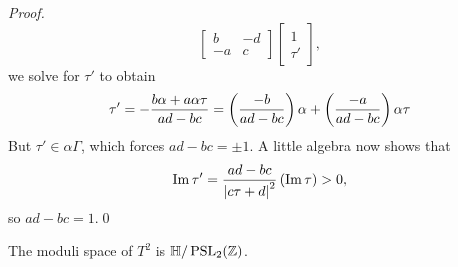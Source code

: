 \documentclass[../Moduli_Spaces_of_Riemann_Surfaces.tex]{subfiles}
\begin{document}
\begin{proof}
\begin{equation*}
\begin{bmatrix}
                b & -d \\
                -a & c
            \end{bmatrix}
            \begin{bmatrix}
                1 \\ \tau'
            \end{bmatrix},
        \end{equation*}
        we solve for $\tau'$ to obtain
        \begin{equation*}
            \tau'=-\frac{b\alpha+a\alpha\tau}{ad-bc}=\left(\frac{-b}{ad-bc}\right)\alpha+\left(\frac{-a}{ad-bc}\right)\alpha\tau
        \end{equation*}
        But $\tau'\in\alpha\Gamma$, which forces $ad-bc=\pm1$. A little algebra now shows that
        \begin{equation*}
            \operatorname{Im}\tau'=\frac{ad-bc}{\left|c\tau+d\right|^2}\left(\operatorname{Im}\tau\right)>0,
        \end{equation*}
        so $ad-bc=1$.\qed
    \end{proof}
    \begin{corollary}
        The moduli space of $T^2$ is $\mathbb{H}/\operatorname{PSL}_{2}\!\left(\mathbb{Z}\right)$.
    \end{corollary}
\end{document}
